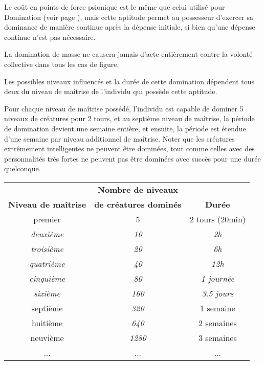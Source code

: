Le coût en points de force psionique est le même que celui utilisé pour Domination (voir page \pageref{guerrier-domination}), mais cette aptitude permet au possesseur d'exercer sa dominance de manière continue après la dépense initiale, si bien qu'une dépense continue n'est pas nécessaire.

\bigskip

La domination de masse ne causera jamais d'acte entièrement contre la volonté collective dans tous les cas de figure.

\bigskip

Les possibles niveaux influencés et la durée de cette domination dépendent tous deux du niveau de maîtrise de l'individu qui possède cette aptitude.

Pour chaque niveau de maîtrise possédé, l'individu est capable de dominer 5 niveaux de créatures pour 2 tours, et au septième niveau de maîtrise, la période de domination devient une semaine entière, et ensuite, la période est étendue d'une semaine par niveau additionnel de maîtrise. Noter que les créatures extrêmement intelligentes ne peuvent être dominées, tout comme celles avec des personnalités très fortes ne peuvent pas être dominées avec succès pour une durée quelconque.

\bigskip

\begin{tabular}{ccc}
                                 &\textbf{Nombre de niveaux} &\\
\textbf{Niveau de maîtrise}      & \textbf{de créatures dominés} & \textbf{Durée} \\
premier             & 5     & 2 tours (20min)      \\
\textit{deuxième}            & \textit{10}    & \textit{2h}                    \\
\textit{troisième}           & \textit{20}    & \textit{6h}                    \\
\textit{quatrième}           & \textit{40}    & \textit{12h}                   \\
\textit{cinquième}           & \textit{80}    & \textit{1 journée}                \\
\textit{sixième}             & \textit{160}   & \textit{3.5 jours} \\
septième   & \textit{320}   & 1 semaine \\
huitième            & \textit{640}   & 2 semaines \\
neuvième            & \textit{1280}  & 3 semaines \\
... & ... & ...
\end{tabular}

